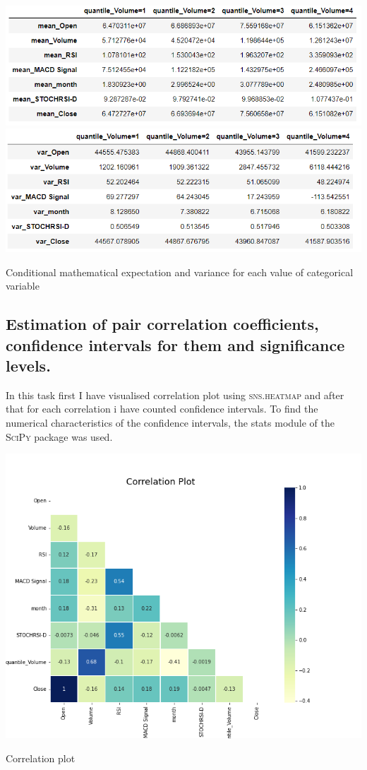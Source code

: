 \documentclass[%
12pt, %
final, %
oneside, %
onecolumn, %
centertags]{article} %
\theoremstyle{plain}
\theoremstyle{definition}
\theoremstyle{remark}
\begin{document}
\begin{center}
\includegraphics[scale=0.9]{images/cond_mean.png}
\includegraphics[scale=0.9]{images/cond_var.png}

Conditional mathematical expectation and variance for each value of categorical variable
\end{center}

\newpage

\subsection{Estimation of pair correlation coefficients, confidence intervals for them and significance levels.}

In this task first I have visualised correlation plot using \textsc{sns.heatmap} and after that for each correlation i have counted confidence intervals. To find the numerical characteristics of the confidence intervals, the stats module of the \textsc{SciPy} package was used.

\begin{center}
\includegraphics[scale=0.5]{images/correlation_plot.png}

Correlation plot
\end{center}
\end{document}
